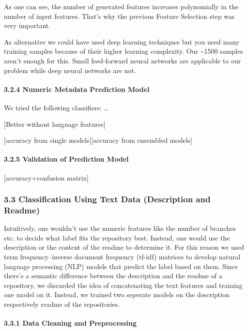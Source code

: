 \documentclass{article}
\begin{document}
As one can see, the number of generated features increases polynomially
in the number of input features. That's why the previous Feature
Selection step was very important.

As alternative we could have used deep learning techniques but you need
many training samples because of their higher learning complexity. Our
\textasciitilde{}1500 samples aren't enough for this. Small feed-forward
neural networks are applicable to our problem while deep neural networks
are not.

\paragraph{3.2.4 Numeric Metadata Prediction
Model}\label{numeric-metadata-prediction-model}

We tried the following classifiers: \ldots{}

{[}Better without language features{]}

{[}accuracy from single models{]}{[}accuracy from ensembled models{]}

\paragraph{3.2.5 Validation of Prediction
Model}\label{validation-of-prediction-model}

{[}accuracy+confusion matrix{]}

\subsubsection{3.3 Classification Using Text Data (Description and
Readme)}\label{classification-using-text-data-description-and-readme}

Intuitively, one wouldn't use the numeric features like the number of
branches etc. to decide what label fits the repository best. Instead,
one would use the description or the content of the readme to determine
it. For this reason we used term frequency--inverse document frequency
(tf-idf) matrices to develop natural language processing (NLP) models
that predict the label based on them. Since there's a semantic
difference between the description and the readme of a repository, we
discarded the idea of concatenating the text features and training one
model on it. Instead, we trained two seperate models on the description
respectively readme of the repositories.

\paragraph{3.3.1 Data Cleaning and
Preprocessing}\label{data-cleaning-and-preprocessing-1}
\end{document}
